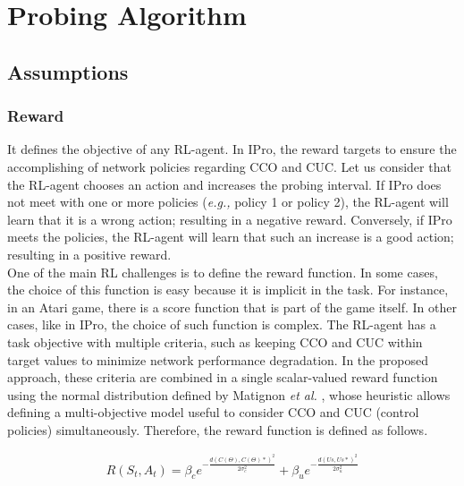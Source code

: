 \section{Probing Algorithm}
\label{sec:ipro_algorithm}

\subsection{Assumptions}
\label{subsec:assumptions}

\subsubsection{Reward}
It defines the objective of any RL-agent. In IPro, the reward targets to ensure the accomplishing of network policies regarding CCO and CUC. Let us consider that the RL-agent chooses an action and increases the probing interval. If IPro does not meet with one or more policies (\textit{e.g.,} policy 1 or policy 2), the RL-agent will learn that it is a wrong action; resulting in a negative reward. Conversely, if IPro meets the policies, the RL-agent will learn that such an increase is a good action; resulting in a positive reward.\\

One of the main RL challenges is to define the reward function. In some cases, the choice of this function is easy because it is implicit in the task. For instance,  in an Atari game, there is a score function that is part of the game itself. In other cases, like in IPro, the choice of such function is complex. The RL-agent has a task objective with multiple criteria, such as keeping CCO and CUC within target values to minimize network performance degradation. In the proposed approach, these criteria are combined in a single scalar-valued reward function using the normal distribution defined by Matignon \textit{et al.} \cite{matignon_2006:improving}, whose heuristic allows defining a multi-objective model useful to consider CCO and CUC (control policies) simultaneously. Therefore, the reward function is defined as follows.

{\setlength{\mathindent}{4cm}
\begin{equation}
    \begin{split}
       R\left ( S_t, A_t \right ) = \beta_c e^{-\frac{d\left ( C\left ( \Theta  \right ), C\left ( \Theta  \right )* \right )^2}{2\sigma_c^2 }} + \beta_u e^{-\frac{d\left ( Us,Us* \right )^2}{2\sigma_u^2 }}
    \end{split}
     \label{equ:reward}
\end{equation}
}

